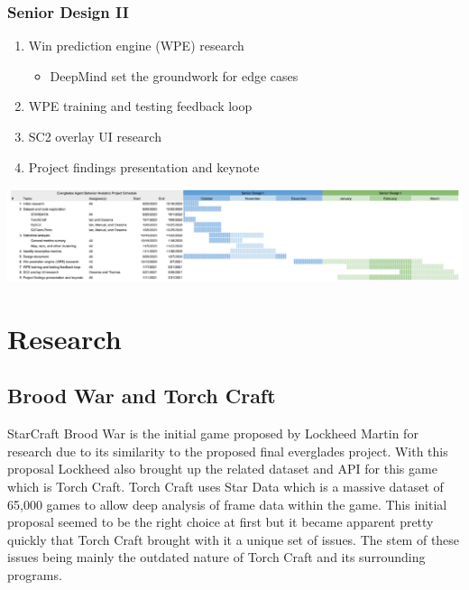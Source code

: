 \documentclass[a4paper,12pt]{report}
\begin{document}
\subsection{Senior Design II}

\begin{enumerate}
    \item Win prediction engine (WPE) research
    \begin{itemize}
        \item DeepMind set the groundwork for edge cases
    \end{itemize}
    \item WPE training and testing feedback loop
    \item SC2 overlay UI research
    \item Project findings presentation and keynote
\end{enumerate}

\begin{center}
    \captionsetup{type=figure}
    \includegraphics[width=1\linewidth]{media/gantt.png}
\end{center}

\chapter{Research}
\section{Brood War and Torch Craft}

StarCraft Brood War is the initial game proposed by Lockheed Martin for research due to its similarity to the proposed final everglades project. With this proposal Lockheed also brought up the related dataset and API for this game which is Torch Craft. Torch Craft uses Star Data which is a massive dataset of 65,000 games to allow deep analysis of frame data within the game. This initial proposal seemed to be the right choice at first but it became apparent pretty quickly that Torch Craft brought with it a unique set of issues. The stem of these issues being mainly the outdated nature of Torch Craft and its surrounding programs.
\end{document}
